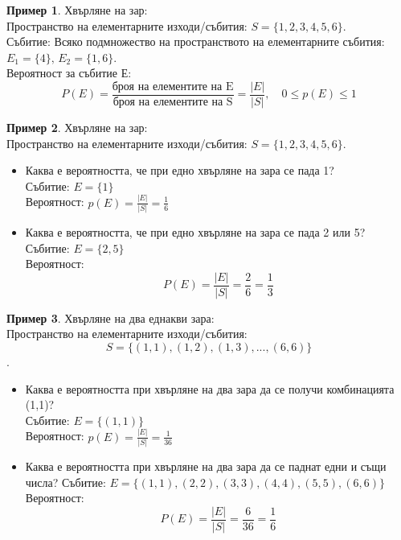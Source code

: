\documentclass[fleqn, 12pt]{article}
\theoremstyle{definition}
\newtheorem{example}{Пример}[subsection]
\begin{document}
\begin{example}
Хвърляне на зар: \\
Пространство на елементарните изходи/събития: $S = \{1,2,3,4,5,6 \}$.\\
Събитие: Всяко подмножество на пространството на елементарните събития: $E_1 = \{ 4\}, \, E_2 = \{1,6 \}$.\\
Вероятност за събитие Е:
$$P(E) = \frac{\text{броя на елементите на E}}{\text{броя на елементите на S}} = \frac{|E|}{|S|}, \quad 0 \leq p(E) \leq 1$$
\end{example}

\begin{example}
Хвърляне на зар: \\
Пространство на елементарните изходи/събития: $S = \{1,2,3,4,5,6 \}$.
\begin{itemize}
\item Каква е вероятността, че при едно хвърляне на зара се пада 1? \\
Събитие: $E = \{ 1\} $\\
Вероятност: $p(E) = \frac{|E|}{|S|} = \frac{1}{6}$
\item Каква е вероятността, че при едно хвърляне на зара се пада 2 или 5?
Събитие: $E = \{2, 5\} $\\
Вероятност: $$P(E) = \frac{|E|}{|S|} = \frac{2}{6} = \frac{1}{3}$$
\end{itemize}
\end{example}

\begin{example}
Хвърляне на два еднакви зара: \\
Пространство на елементарните изходи/събития: $$S = \{(1,1), (1,2), (1,3), ..., (6,6)\}$$.
\begin{itemize}
\item Каква е вероятността при хвърляне на два зара да се получи комбинацията (1,1)? \\
Събитие: $E = \{ (1,1) \} $\\
Вероятност: $p(E) = \frac{|E|}{|S|} = \frac{1}{36}$
\item Каква е вероятността при хвърляне на два зара да се паднат едни и същи числа?
Събитие: $E = \{(1,1), (2,2), (3,3), (4,4), (5,5) , (6,6) \} $\\
Вероятност: $$P(E) = \frac{|E|}{|S|} = \frac{6}{36} = \frac{1}{6}$$
\end{itemize}
\end{example}
\end{document}
